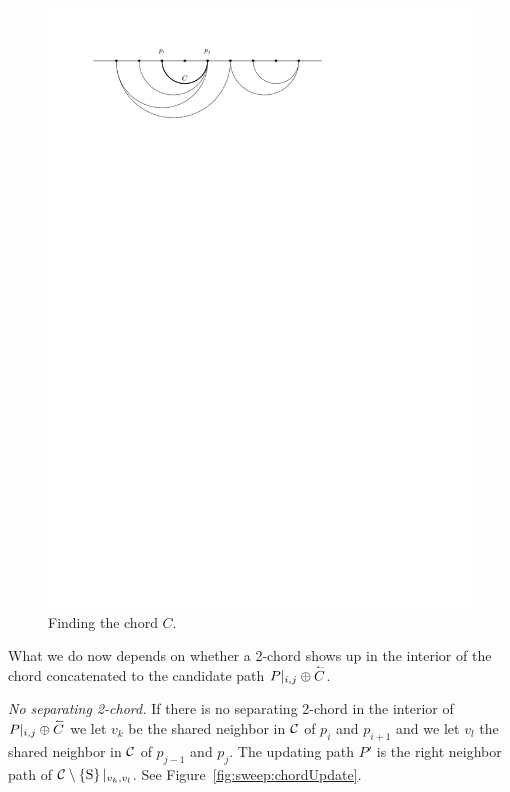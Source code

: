     \begin{figure}[t]
      \centering
      \includegraphics[scale=1]{unifiedalgo/img/sweep/chordsOnCandidatePath}
      \caption{Finding the chord $C$.}
      \label{fig:sweep:chordsOnCandidatePath}
    \end{figure}

    What we do now depends on whether a 2-chord shows up in the interior of the chord concatenated to the candidate path $P|_{i, j} \oplus \accentset{\leftharpoonup}{{C}}$.

    \emph{No separating 2-chord.}
      If there is no separating 2-chord in the interior of $P|_{i, j} \oplus \accentset{\leftharpoonup}{{C}}$ we let $v_k$ be the shared neighbor in $\mathcal{C}$ of $p_{i}$ and $p_{i +1}$ and we let $v_l$ the shared neighbor in $\mathcal{C}$ of $p_{j -1}$ and $p_{j}$. The updating path $P'$ is the right neighbor path of $\mathcal{C} \setminus \left\lbrace {\mathrm{S}} \right\rbrace|_{v_k, v_l}$. See Figure~\ref{fig:sweep:chordUpdate}.

